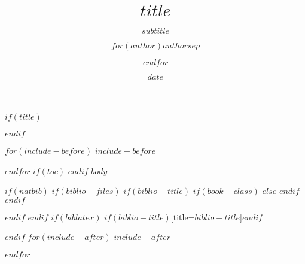 \documentclass[$if(fontsize)$$fontsize$,$endif$$if(lang)$$lang$,$endif$$if(papersize)$$papersize$,$endif$$for(classoption)$$classoption$$sep$,$endfor$]{$documentclass$}
\title{$title$}
\subtitle{$subtitle$}
\author{$for(author)$$author$$sep$ \and $endfor$}
\date{$date$}
\begin{document}
$if(title)$
\maketitle
$endif$

$for(include-before)$
$include-before$

$endfor$
$if(toc)$
{
\hypersetup{linkcolor=black}
\setcounter{tocdepth}{$toc-depth$}
\tableofcontents
}
$endif$
$body$

$if(natbib)$
$if(biblio-files)$
$if(biblio-title)$
$if(book-class)$
\renewcommand\bibname{$biblio-title$}
$else$
\renewcommand\refname{$biblio-title$}
$endif$
$endif$


$endif$
$endif$
$if(biblatex)$
\printbibliography$if(biblio-title)$[title=$biblio-title$]$endif$


$endif$
$for(include-after)$
$include-after$

$endfor$
\end{document}
